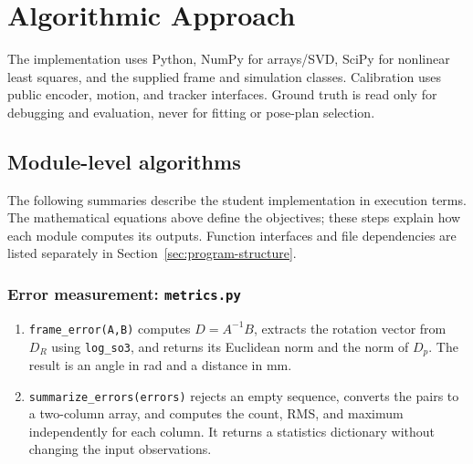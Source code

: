 \documentclass[11pt]{article}
\begin{document}
\section{Algorithmic Approach}
The implementation uses Python, NumPy for arrays/SVD, SciPy for nonlinear least squares, and the supplied frame and simulation classes. Calibration uses public encoder, motion, and tracker interfaces. Ground truth is read only for debugging and evaluation, never for fitting or pose-plan selection.

\subsection{Module-level algorithms}
The following summaries describe the student implementation in execution terms. The mathematical equations above define the objectives; these steps explain how each module computes its outputs. Function interfaces and file dependencies are listed separately in Section~\ref{sec:program-structure}.

\subsubsection{Error measurement: \texttt{metrics.py}}
\begin{enumerate}
\setlength{\itemsep}{0pt}
\item \texttt{frame\_error(A,B)} computes $D=A^{-1}B$, extracts the rotation vector from $D_R$ using \texttt{log\_so3}, and returns its Euclidean norm and the norm of $D_p$. The result is an angle in rad and a distance in mm.
\item \texttt{summarize\_errors(errors)} rejects an empty sequence, converts the pairs to a two-column array, and computes the count, RMS, and maximum independently for each column. It returns a statistics dictionary without changing the input observations.
\end{enumerate}
\end{document}

